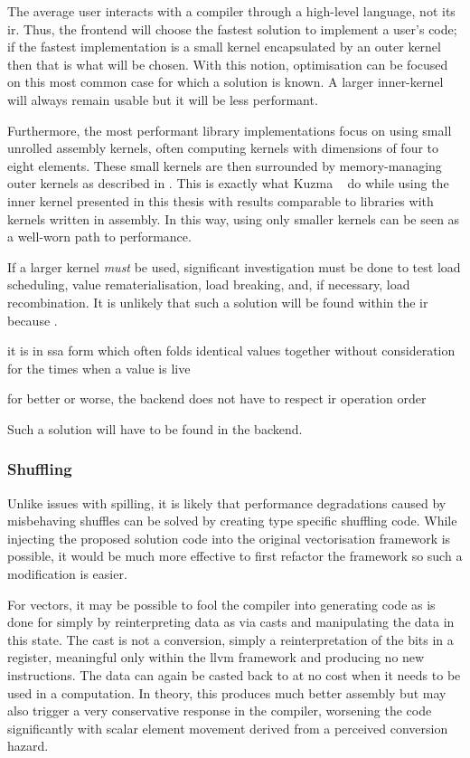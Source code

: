 \documentclass[\main/thesis.tex]{subfiles}
\begin{document}
The average user interacts with a compiler through a high-level language, not its \gls{ir}.
Thus, the frontend will choose the fastest solution to implement a user's code; if the fastest implementation is a small kernel encapsulated by an outer kernel then that is what will be chosen.
With this notion, optimisation can be focused on this most common case for which a solution is known.
A larger inner-kernel will always remain usable but it will be less performant.

Furthermore, the most performant library implementations focus on using small unrolled assembly kernels, often computing kernels with dimensions of four to eight elements.
These small kernels are then surrounded by memory-managing outer kernels as described in .
This is exactly what Kuzma \etal~\autocite{kuzma2021fast} do while using the inner kernel presented in this thesis with results comparable to libraries with kernels written in assembly.
In this way, using only smaller kernels can be seen as a well-worn path to performance.

If a larger kernel \emph{must} be used, significant investigation must be done to test load scheduling, value \gls{rematerialisation}, load breaking, and, if necessary, load recombination.
It is unlikely that such a solution will be found within the \gls{ir} because .
\begin{enumerate*}[itemjoin={{; }}, itemjoin*={{; and }}, label=(\arabic*), after={.}]
  \item it is in \gls{ssa} form which often folds identical values together without consideration for the times when a value is \gls{live}
  \item for better or worse, the backend does not have to respect \gls{ir} operation order
\end{enumerate*}
Such a solution will have to be found in the backend.

\subsubsection{Shuffling}
Unlike issues with spilling, it is likely that performance degradations caused by misbehaving shuffles can be solved by creating type specific shuffling code.
While injecting the proposed solution code into the original vectorisation framework is possible, it would be much more effective to first refactor the framework so such a modification is easier.

For  vectors, it may be possible to fool the compiler into generating code as is done for  simply by reinterpreting data as  via casts and manipulating the data in this state.
The cast is not a conversion, simply a reinterpretation of the bits in a register, meaningful only within the \gls{llvm} framework and producing no new instructions.
The data can again be casted back to  at no cost when it needs to be used in a computation.
In theory, this produces much better assembly but may also trigger a very conservative response in the compiler, worsening the code significantly with scalar element movement derived from a perceived conversion hazard.
\end{document}
